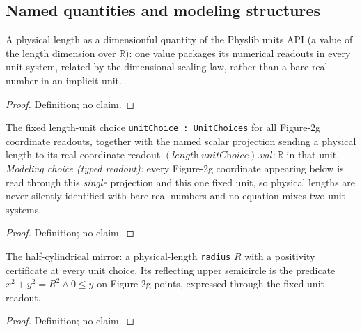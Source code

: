 \subsection*{Named quantities and modeling structures}

\begin{definition}
\label{def:IPhO2026Problems_problem_IPhO_2026_2_C_3:PhysicalLength}
A physical length as a dimensionful quantity of the Physlib units API
(a value of the length dimension over $\mathbb{R}$): one value packages
its numerical readouts in every unit system, related by the dimensional
scaling law, rather than a bare real number in an implicit unit.
\end{definition}
\begin{proof}
Definition; no claim.
\end{proof}

\begin{definition}
\label{def:IPhO2026Problems_problem_IPhO_2026_2_C_3:Figure2gLengthProjection}
The fixed length-unit choice \texttt{unitChoice : UnitChoices} for all
Figure-2g coordinate readouts, together with the named scalar projection
sending a physical length to its real coordinate readout
$(\textit{length}\ \textit{unitChoice}).\textit{val} : \mathbb{R}$ in that
unit.  \emph{Modeling choice (typed readout):} every Figure-2g coordinate
appearing below is read through this \emph{single} projection and this one
fixed unit, so physical lengths are never silently identified with bare
real numbers and no equation mixes two unit systems.
\end{definition}
\begin{proof}
Definition; no claim.
\end{proof}

\begin{definition}
\label{def:IPhO2026Problems_problem_IPhO_2026_2_C_3:Figure2gMirror}
The half-cylindrical mirror: a physical-length \texttt{radius} $R$ with a
positivity certificate at every unit choice.  Its reflecting upper
semicircle is the predicate $x^2 + y^2 = R^2 \wedge 0 \le y$ on Figure-2g
points, expressed through the fixed unit readout.
\end{definition}
\begin{proof}
Definition; no claim.
\end{proof}

